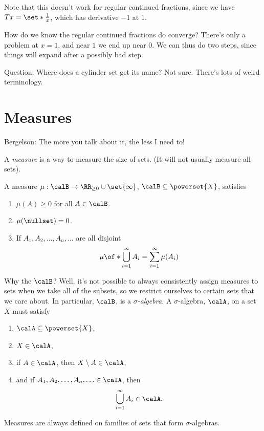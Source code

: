 \documentclass{article}
\begin{document}
Note that this doesn't work for regular continued fractions, since 
we have $Tx=\set*{\frac{1}{x}}$, which has derivative $-1$
at $1$.

How do we know the regular continued fractions do converge?
There's only a problem at $x=1$, and near $1$ we end up near $0$.
We can thus do two steps, since things will expand after 
a possibly bad step.

Question: Where does a cylinder set get its name? Not sure.
There's lots of weird terminology.

\section{Measures}

Bergelson: The more you talk about it, the less I need to!

\begin{definition}
    A \emph{measure} is a way to measure the size of sets. (It will
    not usually measure all sets).

    A measure $\mu : \calB \to \RR_{\ge 0}\cup\set{\infty}$,
    $\calB\subseteq \powerset{X}$,
    satisfies
    \begin{enumerate}
        \item $\mu(A)\ge 0$ for all $A\in\calB$.
        \item $\mu(\nullset)=0$.
        \item If $A_1,A_2,\ldots,A_n,\ldots$ are all disjoint
            \[ \mu\of*{\bigcup_{i=1}^\infty A_i }
            = \sum_{i=1}^\infty \mu(A_i)\]
    \end{enumerate}

    Why the $\calB$? Well, it's not possible to always 
    consistently assign measures to sets when we take all of
    the subsets, so we restrict ourselves to certain sets
    that we care about. In particular, $\calB$, is a 
    \emph{$\sigma$-algebra.} 
    A $\sigma$-algebra, $\calA$, on a set $X$ must satisfy
    \begin{enumerate}
        \item $\calA\subseteq \powerset{X}$,
        \item $X\in \calA$,
        \item if $A\in\calA$, then $X\setminus A\in\calA$,
        \item and if $A_1,A_2,\ldots,A_n,\ldots \in \calA$,
            then \[ \bigcup_{i=1}^\infty A_i \in \calA. \]
    \end{enumerate}

    Measures are always defined on families of sets that
    form $\sigma$-algebras.
\end{definition}
\end{document}
